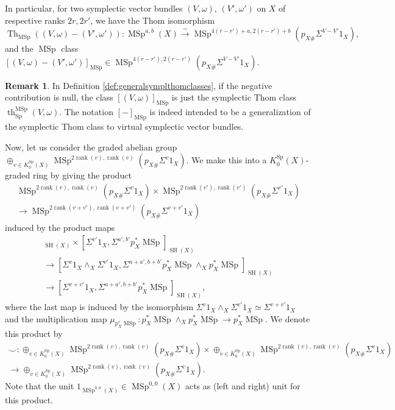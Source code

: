 \documentclass[10pt]{amsart}
\theoremstyle{definition}
\newtheorem{rmk}[defn]{Remark}
\theoremstyle{plain}
\numberwithin{equation}{section}
\newcommand{\0}{\emptyset}
\newcommand{\MSp}{{\operatorname{MSp}}}
\newcommand{\Sp}{{\operatorname{Sp}}}
\newcommand{\SH}{{\operatorname{SH}}}
\newcommand{\Th}{{\operatorname{Th}}}
\renewcommand{\th}{{\operatorname{th}}}
\newcommand{\rnk}{{\operatorname{rank}}}
\begin{document}
In particular, for two symplectic vector bundles $(V,\omega)$, $(V',\omega')$ on $X$ of respective ranks $2r, 2r'$, we have the Thom isomorphism
\[
\Th_\MSp((V,\omega)-(V',\omega')):\MSp^{a,b}(X)\xrightarrow{\sim}
\MSp^{4(r-r')+a, 2(r-r')+b}(p_{X\#}\Sigma^{V-V'}1_X),
\]
and the $\MSp$ class $[(V,\omega)-(V',\omega')]_\MSp\in \MSp^{4(r-r'), 2(r-r')}(p_{X\#}\Sigma^{V-V'}1_X)$.

\begin{rmk}
\label{rmk:thomclass}
    In Definition \ref{def:generalsymplthomclasses}, if the negative contribution is null, the class $[(V,\omega)]_{\MSp}$ is just the symplectic Thom class $\th_\Sp^{\MSp}(V,\omega)$. The notation $[-]_{\MSp}$ is indeed intended to be a generalization of the symplectic Thom class to virtual symplectic vector bundles.
\end{rmk}

Now, let us consider the graded abelian group $\oplus_{v\in K_0^\Sp(X)}\MSp^{2\rnk(v), \rnk(v)}(p_{X\#}\Sigma^v1_X)$. We make this into a
$K_0^\Sp(X)$-graded ring by giving the product 
\begin{multline*}
\MSp^{2\rnk(v), \rnk(v)}(p_{X\#}\Sigma^v1_X)\times \MSp^{2\rnk(v'), \rnk(v')}(p_{X\#}\Sigma^{v'}1_X)\\\to \MSp^{2\rnk(v+v'), \rnk(v+v')}(p_{X\#}\Sigma^{v+v'}1_X)
\end{multline*}
induced by the product maps
\begin{multline*}
[\Sigma^v1_X,\Sigma^{a,b}p_X^*\MSp]_{\SH(X)}\times
[\Sigma^{v'}1_X,\Sigma^{a',b'}p_X^*\MSp]_{\SH(X)}\\\to
[\Sigma^v1_X\wedge_X\Sigma^{v'}1_X, \Sigma^{a+a',b+b'}p_X^*\MSp\wedge_Xp_X^*\MSp]_{\SH(X)}\\\to 
[\Sigma^{v+v'}1_X, \Sigma^{a+a',b+b'}p_X^*\MSp]_{\SH(X)},
\end{multline*}
where the last map is induced by the isomorphism $\Sigma^v1_X\wedge_X\Sigma^{v'}1_X \simeq  
\Sigma^{v+v'}1_X$ and the multiplication map $\mu_{p_X^*\MSp}:p_X^*\MSp\wedge_Xp_X^*\MSp\to
p_X^*\MSp$. We denote this product by
\begin{multline*}
\smile:\oplus_{v\in K_0^\Sp(X)}\MSp^{2\rnk(v), \rnk(v)}(p_{X\#}\Sigma^v1_X)\times \oplus_{v\in K_0^\Sp(X)}\MSp^{2\rnk(v), \rnk(v)}(p_{X\#}\Sigma^v1_X)\\
\to \oplus_{v\in K_0^\Sp(X)}\MSp^{2\rnk(v), \rnk(v)}(p_{X\#}\Sigma^v1_X).
\end{multline*}
Note that the unit $1_{\MSp^{0,0}(X)}\in \MSp^{0,0}(X)$ acts as (left and right) unit for this product.
\end{document}
